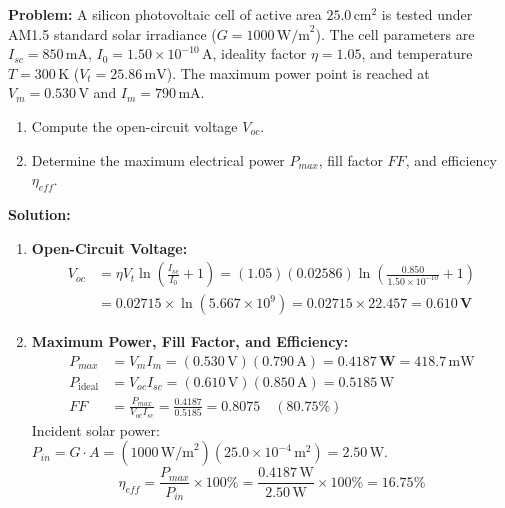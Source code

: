 \begin{examplebox}
\textbf{Problem:} A silicon photovoltaic cell of active area $25.0\,\text{cm}^2$ is tested under AM1.5 standard solar irradiance ($G = 1000\,\text{W/m}^2$). The cell parameters are $I_{sc} = 850\,\text{mA}$, $I_0 = 1.50 \times 10^{-10}\,\text{A}$, ideality factor $\eta = 1.05$, and temperature $T = 300\,\text{K}$ ($V_t = 25.86\,\text{mV}$). The maximum power point is reached at $V_m = 0.530\,\text{V}$ and $I_m = 790\,\text{mA}$.
\begin{enumerate}[label=(\alph*)]
    \item Compute the open-circuit voltage $V_{oc}$.
    \item Determine the maximum electrical power $P_{max}$, fill factor $FF$, and efficiency $\eta_{eff}$.
\end{enumerate}

\textbf{Solution:}
\begin{enumerate}[label=(\alph*)]
    \item \textbf{Open-Circuit Voltage:}
    \begin{align}
        V_{oc} &= \eta V_t \ln\left(\frac{I_{sc}}{I_0} + 1\right) = (1.05)(0.02586)\ln\left(\frac{0.850}{1.50 \times 10^{-10}} + 1\right) \\
        &= 0.02715 \times \ln(5.667 \times 10^9) = 0.02715 \times 22.457 = \mathbf{0.610\,\text{V}}
    \end{align}
    \item \textbf{Maximum Power, Fill Factor, and Efficiency:}
    \begin{align}
        P_{max} &= V_m I_m = (0.530\,\text{V})(0.790\,\text{A}) = \mathbf{0.4187\,\text{W}} = 418.7\,\text{mW} \\
        P_{\text{ideal}} &= V_{oc} I_{sc} = (0.610\,\text{V})(0.850\,\text{A}) = 0.5185\,\text{W} \\
        FF &= \frac{P_{max}}{V_{oc} I_{sc}} = \frac{0.4187}{0.5185} = \mathbf{0.8075} \quad (80.75\%)
    \end{align}
    Incident solar power: $P_{in} = G \cdot A = (1000\,\text{W/m}^2)(25.0 \times 10^{-4}\,\text{m}^2) = 2.50\,\text{W}$.
    \begin{equation}
        \eta_{eff} = \frac{P_{max}}{P_{in}} \times 100\% = \frac{0.4187\,\text{W}}{2.50\,\text{W}} \times 100\% = \mathbf{16.75\%}
    \end{equation}
\end{enumerate}
\end{examplebox}

